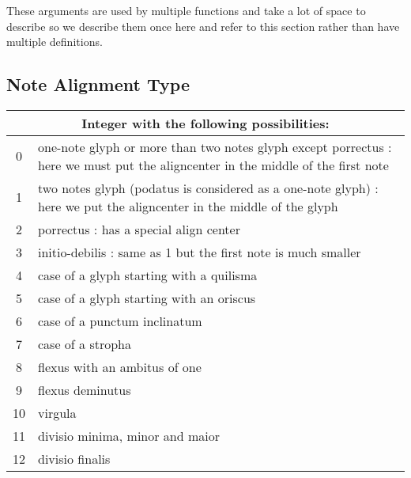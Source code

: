 These arguments are used by multiple functions and take a lot of space
to describe so we describe them once here and refer to this section
rather than have multiple definitions.

\subsection{Note Alignment Type}\label{notesalign}
\begin{tabular}{cp{}}
  \multicolumn{2}{c}{Integer with the following possibilities:} \\
  \hline
  0 & one-note glyph or more than two notes glyph except porrectus : here we must put the aligncenter in the middle of the first note\\
  1 & two notes glyph (podatus is considered as a one-note glyph) : here we put the aligncenter in the middle of the glyph\\
  2 & porrectus : has a special align center\\
  3 & initio-debilis : same as 1 but the first note is much smaller\\
  4 & case of a glyph starting with a quilisma\\
  5 & case of a glyph starting with an oriscus\\
  6 & case of a punctum inclinatum\\
  7 & case of a stropha\\
  8 & flexus with an ambitus of one\\
  9 & flexus deminutus\\
  10 & virgula\\
  11 & divisio minima, minor and maior\\
  12 & divisio finalis
 \end{tabular}

